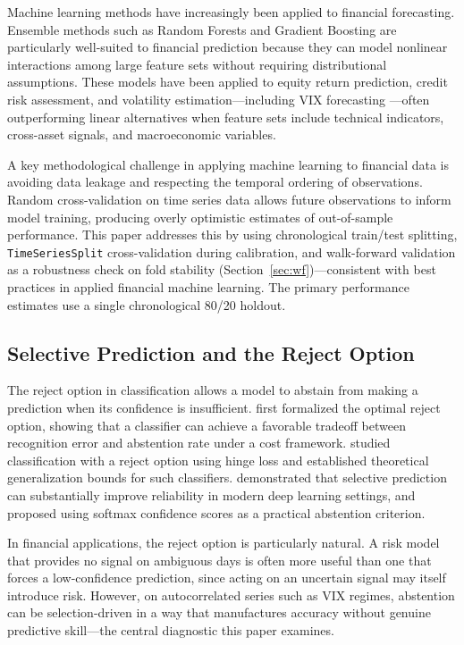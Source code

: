 \documentclass[12pt]{article}
\begin{document}
Machine learning methods have increasingly been applied to financial forecasting. Ensemble methods such as Random Forests \citep{breiman2001} and Gradient Boosting are particularly well-suited to financial prediction because they can model nonlinear interactions among large feature sets without requiring distributional assumptions. These models have been applied to equity return prediction, credit risk assessment, and volatility estimation---including VIX forecasting \citep{fernandes2014}---often outperforming linear alternatives when feature sets include technical indicators, cross-asset signals, and macroeconomic variables.

A key methodological challenge in applying machine learning to financial data is avoiding data leakage and respecting the temporal ordering of observations. Random cross-validation on time series data allows future observations to inform model training, producing overly optimistic estimates of out-of-sample performance. This paper addresses this by using chronological train/test splitting, \texttt{TimeSeriesSplit} cross-validation during calibration, and walk-forward validation as a robustness check on fold stability (Section~\ref{sec:wf})---consistent with best practices in applied financial machine learning. The primary performance estimates use a single chronological 80/20 holdout.

\subsection{Selective Prediction and the Reject Option}

The reject option in classification allows a model to abstain from making a prediction when its confidence is insufficient. \citet{chow1970} first formalized the optimal reject option, showing that a classifier can achieve a favorable tradeoff between recognition error and abstention rate under a cost framework. \citet{bartlett2008} studied classification with a reject option using hinge loss and established theoretical generalization bounds for such classifiers. \citet{geifman2017} demonstrated that selective prediction can substantially improve reliability in modern deep learning settings, and proposed using softmax confidence scores as a practical abstention criterion.

In financial applications, the reject option is particularly natural. A risk model that provides no signal on ambiguous days is often more useful than one that forces a low-confidence prediction, since acting on an uncertain signal may itself introduce risk. However, on autocorrelated series such as VIX regimes, abstention can be selection-driven in a way that manufactures accuracy without genuine predictive skill---the central diagnostic this paper examines.
\end{document}
